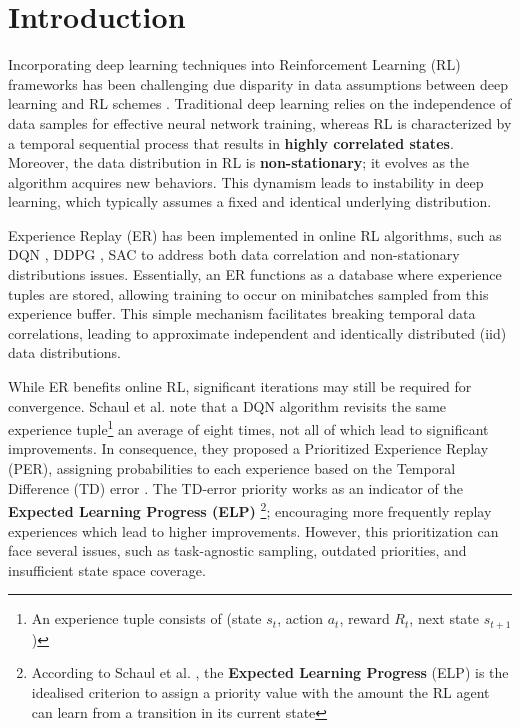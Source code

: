 
\chapter{Introduction}

Incorporating deep learning techniques into Reinforcement Learning (RL) frameworks has been challenging due disparity in data assumptions between deep learning and RL schemes \cite{mnih2013playing}. Traditional deep learning relies on the independence of data samples for effective neural network training, whereas RL is characterized by a temporal sequential process that results in \textbf{highly correlated states}. Moreover, the data distribution in RL is \textbf{non-stationary}; it evolves as the algorithm acquires new behaviors. This dynamism leads to instability in deep learning, which typically assumes a fixed and identical underlying distribution.

Experience Replay (ER) has been implemented in online RL algorithms, such as DQN \cite{mnih2013playing}, DDPG \cite{lillicrap2015continuous}, SAC \cite{haarnoja2018soft} to address both data correlation and non-stationary distributions issues. Essentially, an ER functions as a database where experience tuples are stored, allowing training to occur on minibatches sampled from this experience buffer. This simple mechanism facilitates breaking temporal data correlations, leading to approximate independent and identically distributed (iid) data distributions.

While ER benefits online RL, significant iterations may still be required for convergence. Schaul et al. \cite{schaul2015prioritized} note that a DQN algorithm revisits the same experience tuple\footnote[2]{An experience tuple consists of (state $s_{t}$, action $a_{t}$, reward $R_{t}$, next state $s_{t+1}$)} an average of eight times, not all of which lead to significant improvements. In consequence, they proposed a Prioritized Experience Replay (PER), assigning probabilities to each experience based on the Temporal Difference (TD) error \cite{sutton2018reinforcement}. The TD-error priority works as an indicator of the \textbf{Expected Learning Progress (ELP)} \cite{schaul2015prioritized}\footnote{According to Schaul et al. \cite{schaul2015prioritized}, the \textbf{Expected Learning Progress} (ELP) is the idealised criterion to assign a priority value with the amount the RL agent can learn from a transition in its current state}; encouraging more frequently replay experiences which lead to higher improvements. However, this prioritization can face several issues, such as task-agnostic sampling, outdated priorities, and insufficient state space coverage.

